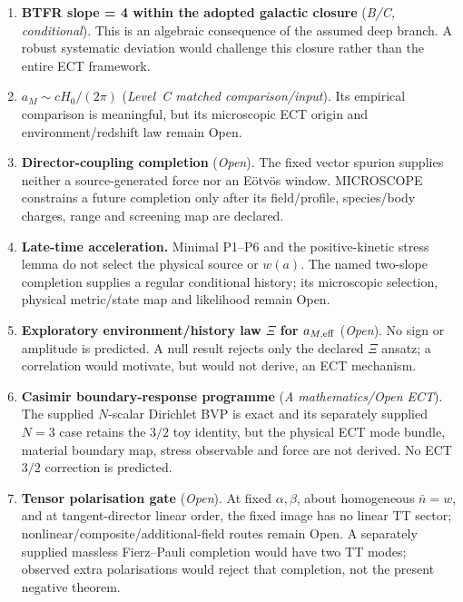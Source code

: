 \documentclass[11pt,a4paper]{article}
\begin{document}
\begin{enumerate}
\item \textbf{BTFR slope = 4 within the adopted galactic closure} (\emph{B/C, conditional}). This is an algebraic consequence of the assumed deep branch. A robust systematic deviation would challenge this closure rather than the entire ECT framework.

\item \textbf{$a_M \sim cH_0/(2\pi)$} (\emph{Level~C matched
comparison/input}). Its empirical comparison is meaningful, but its
microscopic ECT origin and environment/redshift law remain Open.

\item \textbf{Director-coupling completion} (\emph{Open}).  The fixed vector spurion supplies neither a source-generated force nor an E\"otv\"os window.  MICROSCOPE constrains a future completion only after its field/profile, species/body charges, range and screening map are declared.

\item \textbf{Late-time acceleration.} Minimal P1--P6 and the
positive-kinetic stress lemma do not select the physical source or $w(a)$.
The named two-slope completion supplies a regular conditional history; its
microscopic selection, physical metric/state map and likelihood remain Open.

\item \textbf{Exploratory environment/history law $\Xi$ for $a_{M,\rm eff}$} (\emph{Open}). No sign or amplitude is predicted. A null result rejects only the declared $\Xi$ ansatz; a correlation would motivate, but would not derive, an ECT mechanism.

\item \textbf{Casimir boundary-response programme} (\emph{A mathematics/Open ECT}). The supplied $N$-scalar Dirichlet BVP is exact and its separately supplied $N=3$ case retains the $3/2$ toy identity, but the physical ECT mode bundle, material boundary map, stress observable and force are not derived.  No ECT $3/2$ correction is predicted.

\item \textbf{Tensor polarisation gate} (\emph{Open}). At fixed $\alpha,\beta$, about homogeneous $\bar n=w$, and at tangent-director linear order, the fixed image has no linear TT sector; nonlinear/composite/additional-field routes remain Open.  A separately supplied massless Fierz--Pauli completion would have two TT modes; observed extra polarisations would reject that completion, not the present negative theorem.


\end{enumerate}
\end{document}
